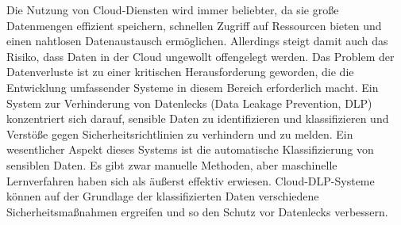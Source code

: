 Die Nutzung von Cloud-Diensten wird immer beliebter, da sie große Datenmengen effizient speichern, schnellen Zugriff auf Ressourcen bieten und einen nahtlosen Datenaustausch ermöglichen. Allerdings steigt damit auch das Risiko, dass Daten in der Cloud ungewollt offengelegt werden. Das Problem der Datenverluste ist zu einer kritischen Herausforderung geworden, die die Entwicklung umfassender Systeme in diesem Bereich erforderlich macht. Ein System zur Verhinderung von Datenlecks (Data Leakage Prevention, DLP) konzentriert sich darauf, sensible Daten zu identifizieren und klassifizieren und Verstöße gegen Sicherheitsrichtlinien zu verhindern und zu melden. Ein wesentlicher Aspekt dieses Systems ist die automatische Klassifizierung von sensiblen Daten. Es gibt zwar manuelle Methoden, aber maschinelle Lernverfahren haben sich als äußerst effektiv erwiesen. Cloud-DLP-Systeme können auf der Grundlage der klassifizierten Daten verschiedene Sicherheitsmaßnahmen ergreifen und so den Schutz vor Datenlecks verbessern.

